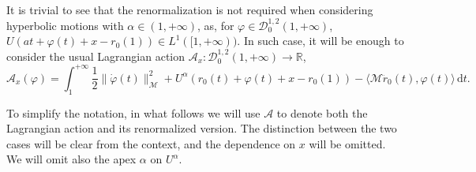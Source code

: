 \documentclass[a4paper,10pt]{amsart}
\newcommand{\numberset}{\mathbb}
\newcommand{\R}{\numberset{R}}
\theoremstyle{plain}
\theoremstyle{definition}
\numberwithin{equation}{section}
\numberwithin{thm}{section}
\begin{document}
It is trivial to see that the renormalization is not required when considering hyperbolic motions with $\alpha\in(1,+\infty)$, as, for $\varphi\in\mathcal{D}_0^{1,2}(1,+\infty)$,  $U(at + \varphi(t) +x - r_0(1))\in L^1([1,+\infty))$. In such case, it will be enough to consider the usual Lagrangian action $\mathcal{A}_x:\mathcal{D}_0^{1,2}(1,+\infty)\rightarrow\R$,
\[
\mathcal{A}_x(\varphi) = \int_1^{+\infty}  \frac{1}{2} \|\dot{\varphi}(t)\|_\mathcal{M}^2 + U^\alpha(r_0(t) +\varphi(t) +  x - r_0(1)) - \langle \mathcal{M} \ddot{r}_0(t), \varphi(t) \rangle \, \mathrm{d}t. 
\]

To simplify the notation, in what follows we will use $\mathcal{A}$ to denote both the Lagrangian action and its renormalized version. The distinction between the two cases will be clear from the context, and the dependence on $x$ will be omitted. We will omit also the apex $\alpha$ on $U^\alpha$.
\end{document}
